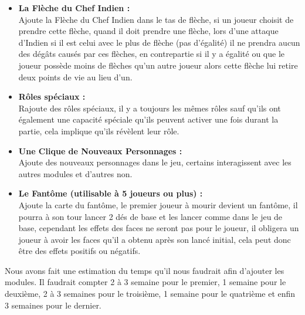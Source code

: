 \documentclass[a4paper,11pt]{article}
\begin{document}
\begin{itemize}
	\item \textbf{La Flèche du Chef Indien :}\\
	
	Ajoute la Flèche du Chef Indien dans le tas de flèche, si un joueur choisit de prendre cette flèche, quand il doit prendre une flèche, lors d’une attaque d’Indien si il est celui avec le plus de flèche (pas d’égalité) il ne prendra aucun des dégâts causés par ces flèches, en contrepartie si il y a égalité ou que le joueur possède moins de flèches qu’un autre joueur alors cette flèche lui retire deux points de vie au lieu d’un. \\

	\item \textbf{Rôles spéciaux :} \\
	
	Rajoute des rôles spéciaux, il y a toujours les mêmes rôles sauf qu’ils ont également une capacité spéciale qu’ils peuvent activer une fois durant la partie, cela implique qu’ils révèlent leur rôle. \\

	\item \textbf{Une Clique de Nouveaux Personnages :} \\
	
	 Ajoute des nouveaux personnages dans le jeu, certains interagissent avec les autres modules et d’autres non. \\

	\item \textbf{Le Fantôme (utilisable à 5 joueurs ou plus) :}\\
	
	 Ajoute la carte du fantôme, le premier joueur à mourir devient un fantôme, il pourra à son tour lancer 2 dés de base et les lancer comme dans le jeu de base, cependant les effets des faces ne seront pas pour le joueur, il obligera un joueur à avoir les faces qu’il a obtenu après son lancé initial, cela peut donc être des effets positifs ou négatifs. \\

\end{itemize}


	Nous avons fait une estimation du temps qu’il nous faudrait afin d’ajouter les modules. Il faudrait compter 2 à 3 semaine pour le premier, 1 semaine pour le deuxième, 2 à 3 semaines pour le troisième, 1 semaine pour le quatrième et enfin 3 semaines pour le dernier. \\
\end{document}
